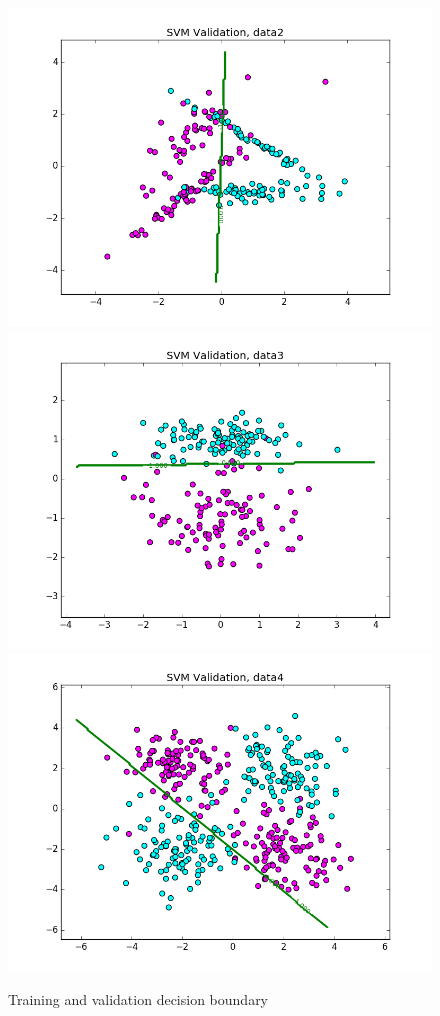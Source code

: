 \documentclass{article}
\begin{document}
\begin{figure}[width=\linewidth]
\begin{multicols}{2}
  \includegraphics[width=1.2\linewidth]{code/P2/data2,validation.png}
  \includegraphics[width=1.2\linewidth]{code/P2/data3,validation.png}
  \includegraphics[width=1.2\linewidth]{code/P2/data4,validation.png}
\end{multicols}
\caption{Training and validation decision boundary}
\end{figure}
\end{document}
